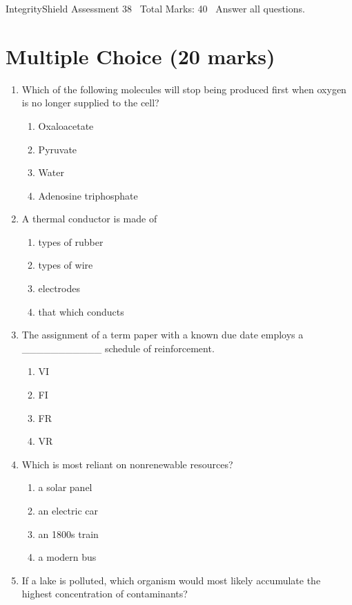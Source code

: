 \documentclass[12pt]{article}
\begin{document}
\begin{center}
IntegrityShield Assessment 38 \
Total Marks: 40 \
Answer all questions.
\end{center}

\section*{Multiple Choice (20 marks)}
\begin{enumerate}[label=\arabic*.]
\item Which of the following molecules will stop being produced first when oxygen is no longer supplied to the cell?
\begin{enumerate}[label=(\alph*)]
    \item Oxaloacetate
    \item Pyruvate
    \item Water
    \item Adenosine triphosphate
\end{enumerate}
\item A thermal conductor is made of
\begin{enumerate}[label=(\alph*)]
    \item types of rubber
    \item types of wire
    \item electrodes
    \item that which conducts
\end{enumerate}
\item The assignment of a term paper with a known due date employs a \_\_\_\_\_\_\_\_\_\_\_ schedule of reinforcement.
\begin{enumerate}[label=(\alph*)]
    \item VI
    \item FI
    \item FR
    \item VR
\end{enumerate}
\item Which is most reliant on nonrenewable resources?
\begin{enumerate}[label=(\alph*)]
    \item a solar panel
    \item an electric car
    \item an 1800s train
    \item a modern bus
\end{enumerate}
\item If a lake is polluted, which organism would most likely accumulate the highest concentration of contaminants?

\end{enumerate}
\end{document}
